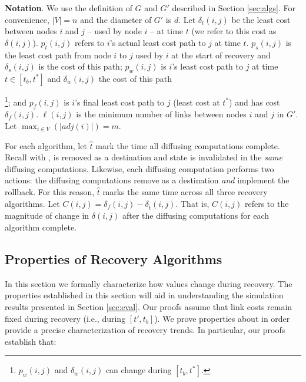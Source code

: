 {\bf Notation}. We use the definition of $G$ and $G'$ described in Section \ref{sec:algs}. For convenience, $|V| = n$ and the diameter of $G'$ is $d$.
Let $\delta_t(i,j)$ be the least cost between nodes $i$ and $j$ -- used by node $i$ --  at time $t$ (we refer to this cost as $\delta(i,j)$).
$p_t(i,j)$ refers to $i$'s actual least cost path to $j$ at time $t$.
 $p_s(i,j)$ is the least cost path from node $i$ to $j$ used by $i$ at the start of recovery 
and $\delta_s(i,j)$ is the cost of this path; $p_w(i,j)$ is $i$'s least cost path to $j$ at time $t \in [t_b,t^*]$ and $\delta_w(i,j)$ the cost of this path 
{\footnote {\small $p_w(i,j)$ and $\delta_w(i,j)$ can change during $[t_b,t^*]$.}; and $p_f(i,j)$ is $i$'s final least cost path to $j$ (least cost at $t^*$)
 and has cost $\delta_f(i,j)$.  $\ell(i,j)$ is the minimum number of links between nodes $i$ and $j$ in $G'$.  
Let $\displaystyle \max_{i \in V}(|adj(i)|) = m$.  

For each algorithm, let $\hat{t}$ mark the time all diffusing computations complete.  Recall with \purges, \bad is removed as a destination and 
\badvector state is invalidated in the \emph{same} diffusing computations.   Likewise, each \cpr diffusing computation performs two actions: 
the diffusing computations remove \bad as a destination \emph{and} implement the rollback.  For this reason, $\hat{t}$ marks the same time across all three recovery algorithms. 
Let $C(i,j) = \delta_f(i,j) - \delta_{\hat{t}}(i,j)$.  That is, $C(i,j)$ refers to the magnitude of change in $\delta(i,j)$ after the diffusing computations for each algorithm complete.


\subsection{Properties of Recovery Algorithms}
\label{subsec:trends}

In this section we formally characterize how \minv values change during recovery. The properties established in this section will aid
in understanding the simulation results presented in Section \ref{sec:eval}. Our proofs assume that link costs remain fixed during recovery (i.e., during $[t',t_b]$).
We prove properties about \minv in order provide a precise characterization of recovery trends.  
In particular, our proofs establish that:

}
